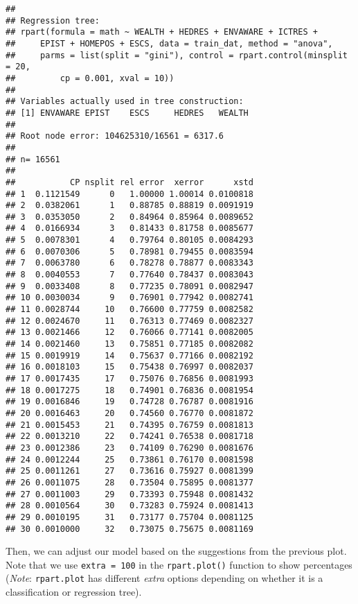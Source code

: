 \documentclass[]{book}
\begin{document}
\begin{verbatim}
## 
## Regression tree:
## rpart(formula = math ~ WEALTH + HEDRES + ENVAWARE + ICTRES + 
##     EPIST + HOMEPOS + ESCS, data = train_dat, method = "anova", 
##     parms = list(split = "gini"), control = rpart.control(minsplit = 20, 
##         cp = 0.001, xval = 10))
## 
## Variables actually used in tree construction:
## [1] ENVAWARE EPIST    ESCS     HEDRES   WEALTH  
## 
## Root node error: 104625310/16561 = 6317.6
## 
## n= 16561 
## 
##           CP nsplit rel error  xerror      xstd
## 1  0.1121549      0   1.00000 1.00014 0.0100818
## 2  0.0382061      1   0.88785 0.88819 0.0091919
## 3  0.0353050      2   0.84964 0.85964 0.0089652
## 4  0.0166934      3   0.81433 0.81758 0.0085677
## 5  0.0078301      4   0.79764 0.80105 0.0084293
## 6  0.0070306      5   0.78981 0.79455 0.0083594
## 7  0.0063780      6   0.78278 0.78877 0.0083343
## 8  0.0040553      7   0.77640 0.78437 0.0083043
## 9  0.0033408      8   0.77235 0.78091 0.0082947
## 10 0.0030034      9   0.76901 0.77942 0.0082741
## 11 0.0028744     10   0.76600 0.77759 0.0082582
## 12 0.0024670     11   0.76313 0.77469 0.0082327
## 13 0.0021466     12   0.76066 0.77141 0.0082005
## 14 0.0021460     13   0.75851 0.77185 0.0082082
## 15 0.0019919     14   0.75637 0.77166 0.0082192
## 16 0.0018103     15   0.75438 0.76997 0.0082037
## 17 0.0017435     17   0.75076 0.76856 0.0081993
## 18 0.0017275     18   0.74901 0.76836 0.0081954
## 19 0.0016846     19   0.74728 0.76787 0.0081916
## 20 0.0016463     20   0.74560 0.76770 0.0081872
## 21 0.0015453     21   0.74395 0.76759 0.0081813
## 22 0.0013210     22   0.74241 0.76538 0.0081718
## 23 0.0012386     23   0.74109 0.76290 0.0081676
## 24 0.0012244     25   0.73861 0.76170 0.0081598
## 25 0.0011261     27   0.73616 0.75927 0.0081399
## 26 0.0011075     28   0.73504 0.75895 0.0081377
## 27 0.0011003     29   0.73393 0.75948 0.0081432
## 28 0.0010564     30   0.73283 0.75924 0.0081413
## 29 0.0010195     31   0.73177 0.75704 0.0081125
## 30 0.0010000     32   0.73075 0.75675 0.0081169
\end{verbatim}

Then, we can adjust our model based on the suggestions from the previous plot. Note that we use \texttt{extra\ =\ 100} in the \texttt{rpart.plot()} function to show percentages (\emph{Note}: \texttt{rpart.plot} has different \emph{extra} options depending on whether it is a classification or regression tree).
\end{document}

